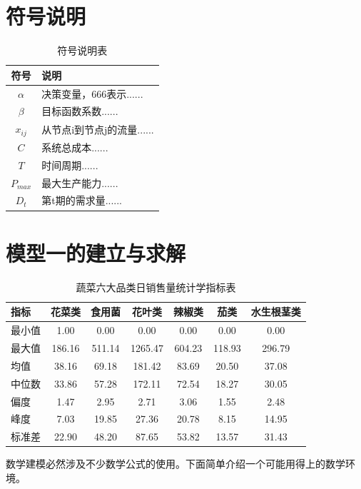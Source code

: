 \documentclass[withoutpreface,bwprint]{cumcmthesis} %
\begin{document}
\section{符号说明}
\begin{table}[htbp]
\centering
\caption{符号说明表}
\label{tab:symbols}
\begin{tabular}{>{\ttfamily}cl}
\toprule
\textrm{符号} & 说明 \\
\midrule
$\alpha$     & 决策变量，666表示...... \\
$\beta$      & 目标函数系数...... \\
$x_{ij}$     & 从节点i到节点j的流量...... \\
$C$          & 系统总成本...... \\
$T$          & 时间周期...... \\
$P_{max}$    & 最大生产能力...... \\
$D_t$        & 第t期的需求量...... \\
\bottomrule
\end{tabular}
\end{table}

\section{模型一的建立与求解}
\begin{table}[htbp]
\centering
\caption{蔬菜六大品类日销售量统计学指标表}
\label{tab:stats}
\begin{tabular}{l *{6}{c}} %
\toprule
\textbf{指标} & \textbf{花菜类} & \textbf{食用菌} & \textbf{花叶类} & \textbf{辣椒类} & \textbf{茄类} & \textbf{水生根茎类} \\
\midrule
最小值   & 1.00    & 0.00    & 0.00    & 0.00    & 0.00    & 0.00    \\
最大值   & 186.16 & 511.14 & 1265.47 & 604.23 & 118.93 & 296.79 \\
均值     & 38.16   & 69.18   & 181.42  & 83.69   & 20.50   & 37.08   \\
中位数   & 33.86   & 57.28   & 172.11  & 72.54   & 18.27   & 30.05   \\
偏度     & 1.47    & 2.95    & 2.71    & 3.06    & 1.55    & 2.48    \\
峰度     & 7.03    & 19.85   & 27.36   & 20.78   & 8.15    & 14.95   \\
标准差  & 22.90   & 48.20   & 87.65   & 53.82   & 13.57   & 31.43   \\
\bottomrule
\end{tabular}
\end{table}
数学建模必然涉及不少数学公式的使用。下面简单介绍一个可能用得上的数学环境。
\end{document}
